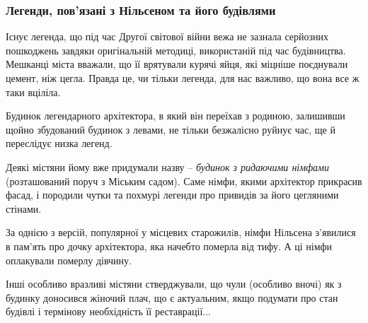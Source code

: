  
 
 
 
 

\subsubsection{Легенди, пов'язані з Нільсеном та його будівлями}

Існує легенда, що під час Другої світової війни вежа не зазнала серйозних
пошкоджень завдяки оригінальній методиці, використаній під час будівництва.
Мешканці міста вважали, що її врятували курячі яйця, які міцніше поєднували
цемент, ніж цегла. Правда це, чи тільки легенда, для нас важливо, що вона все ж
таки вціліла.

Будинок легендарного архітектора, в який він переїхав з родиною, залишивши
щойно збудований будинок з левами, не тільки безжалісно руйнує час, ще й
переслідує низка легенд.

Деякі містяни йому вже придумали назву – \emph{будинок з ридаючими німфами}
(розташований поруч з Міським садом). Саме німфи, якими архітектор прикрасив
фасад, і породили чутки та похмурі легенди про привидів за його цегляними
стінами.


За однією з версій, популярної у місцевих старожилiв, німфи Нільсена з'явилися
в пам'ять про дочку архітектора, яка начебто померла від тифу. А ці німфи
оплакували померлу дівчину.

Інші особливо вразливі містяни стверджували, що чули (особливо вночі) як з
будинку доносився жіночий плач, що є актуальним, якщо подумати про стан будівлі
і термінову необхідність її реставрації...
